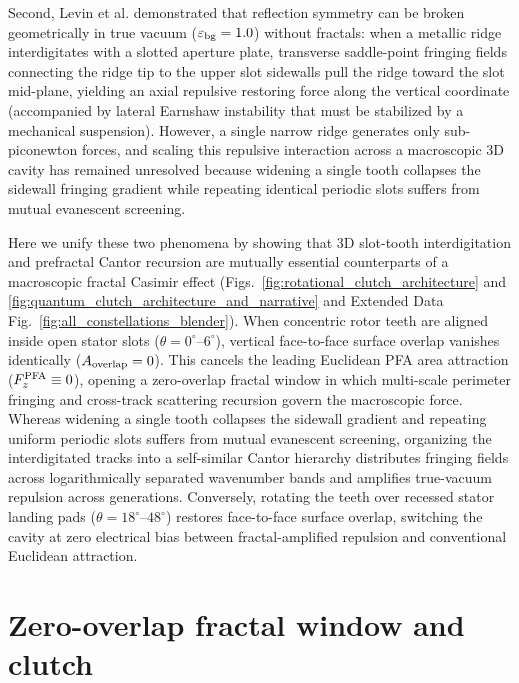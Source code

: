 \documentclass[pdflatex,sn-nature]{sn-jnl}
\begin{document}
Second, Levin et al.\cite{levin2010} demonstrated that reflection symmetry can be broken geometrically in true vacuum ($\varepsilon_{\rm bg}=1.0$) without fractals: when a metallic ridge interdigitates with a slotted aperture plate, transverse saddle-point fringing fields connecting the ridge tip to the upper slot sidewalls pull the ridge toward the slot mid-plane, yielding an axial repulsive restoring force along the vertical coordinate (accompanied by lateral Earnshaw instability that must be stabilized by a mechanical suspension)\cite{levin2010,rodriguez2011}. However, a single narrow ridge generates only sub-piconewton forces\cite{levin2010,rodriguez2011}, and scaling this repulsive interaction across a macroscopic 3D cavity has remained unresolved because widening a single tooth collapses the sidewall fringing gradient while repeating identical periodic slots suffers from mutual evanescent screening.

Here we unify these two phenomena by showing that 3D slot-tooth interdigitation and prefractal Cantor recursion are mutually essential counterparts of a macroscopic fractal Casimir effect (Figs.~\ref{fig:rotational_clutch_architecture} and \ref{fig:quantum_clutch_architecture_and_narrative} and Extended Data Fig.~\ref{fig:all_constellations_blender}). When concentric rotor teeth are aligned inside open stator slots ($\theta = 0^\circ\text{--}6^\circ$), vertical face-to-face surface overlap vanishes identically ($A_{\rm overlap} = 0$). This cancels the leading Euclidean PFA area attraction ($F_z^{\rm PFA} \equiv 0$), opening a zero-overlap fractal window in which multi-scale perimeter fringing and cross-track scattering recursion govern the macroscopic force. Whereas widening a single tooth collapses the sidewall gradient and repeating uniform periodic slots suffers from mutual evanescent screening, organizing the interdigitated tracks into a self-similar Cantor hierarchy distributes fringing fields across logarithmically separated wavenumber bands and amplifies true-vacuum repulsion across generations. Conversely, rotating the teeth over recessed stator landing pads ($\theta = 18^\circ\text{--}48^\circ$) restores face-to-face surface overlap, switching the cavity at zero electrical bias between fractal-amplified repulsion and conventional Euclidean attraction.

\section*{Zero-overlap fractal window and clutch}
\label{sec:architecture}
\end{document}
